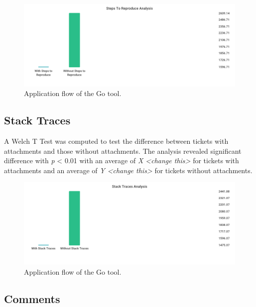 \documentclass{mpaper}
\begin{document}
\begin{figure}
  \begin{center}
  \includegraphics[scale=0.25]{images/steps_to_reproduce.png}
  \end{center}
  \caption{\label{steps}Application flow of the Go tool.}
  \end{figure}

\subsection{Stack Traces}

A Welch T Test was computed to test the difference between tickets with attachments and those 
without attachments. The analysis revealed significant difference with \emph{p} < 0.01 with an
average of \emph{X <change this>} for tickets with attachments and an average of \emph{Y <change this>}
for tickets without attachments.

\begin{figure}
  \begin{center}
  \includegraphics[scale=0.25]{images/stack_traces.png}
  \end{center}
  \caption{\label{stack_traces}Application flow of the Go tool.}
  \end{figure}

\subsection{Comments}
\end{document}
